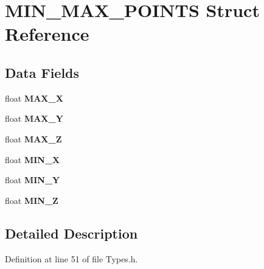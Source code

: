 \hypertarget{struct_m_i_n___m_a_x___p_o_i_n_t_s}{}\section{M\+I\+N\+\_\+\+M\+A\+X\+\_\+\+P\+O\+I\+N\+TS Struct Reference}
\label{struct_m_i_n___m_a_x___p_o_i_n_t_s}
\subsection*{Data Fields}
\begin{DoxyCompactItemize}
\item 
float {\bfseries M\+A\+X\+\_\+X}\hypertarget{struct_m_i_n___m_a_x___p_o_i_n_t_s_a8395854ac1028066dc36f10d0683bb67}{}\label{struct_m_i_n___m_a_x___p_o_i_n_t_s_a8395854ac1028066dc36f10d0683bb67}

\item 
float {\bfseries M\+A\+X\+\_\+Y}\hypertarget{struct_m_i_n___m_a_x___p_o_i_n_t_s_a412bff130a10d619ec2ea7a2ba8f2e39}{}\label{struct_m_i_n___m_a_x___p_o_i_n_t_s_a412bff130a10d619ec2ea7a2ba8f2e39}

\item 
float {\bfseries M\+A\+X\+\_\+Z}\hypertarget{struct_m_i_n___m_a_x___p_o_i_n_t_s_a246715378495b5ffa26983d1a466f316}{}\label{struct_m_i_n___m_a_x___p_o_i_n_t_s_a246715378495b5ffa26983d1a466f316}

\item 
float {\bfseries M\+I\+N\+\_\+X}\hypertarget{struct_m_i_n___m_a_x___p_o_i_n_t_s_aca9241c65718cb92877a7ac04d5c942f}{}\label{struct_m_i_n___m_a_x___p_o_i_n_t_s_aca9241c65718cb92877a7ac04d5c942f}

\item 
float {\bfseries M\+I\+N\+\_\+Y}\hypertarget{struct_m_i_n___m_a_x___p_o_i_n_t_s_ab294df18a3c743057c655ab8e291ac9b}{}\label{struct_m_i_n___m_a_x___p_o_i_n_t_s_ab294df18a3c743057c655ab8e291ac9b}

\item 
float {\bfseries M\+I\+N\+\_\+Z}\hypertarget{struct_m_i_n___m_a_x___p_o_i_n_t_s_a4b4bd356bbcecab72c61770bdd4606bb}{}\label{struct_m_i_n___m_a_x___p_o_i_n_t_s_a4b4bd356bbcecab72c61770bdd4606bb}

\end{DoxyCompactItemize}


\subsection{Detailed Description}


Definition at line 51 of file Types.\+h.

